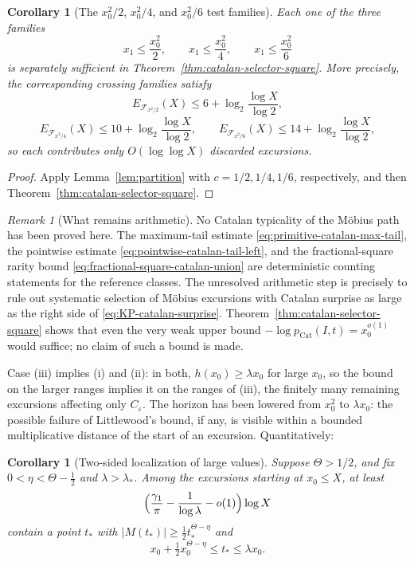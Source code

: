 \documentclass[11pt]{amsart}
\numberwithin{equation}{section}
\theoremstyle{plain}
\newtheorem{corollary}[theorem]{Corollary}
\theoremstyle{definition}
\theoremstyle{remark}
\newtheorem{remark}[theorem]{Remark}
\newcommand{\eps}{\varepsilon}
\newcommand{\F}{\mathcal{F}}
\begin{document}
\begin{corollary}[The $x_0^2/2$, $x_0^2/4$, and $x_0^2/6$ test families]
\label{cor:three-square-catalan-families}
Each one of the three families
\[
 x_1\le\frac{x_0^2}{2},\qquad
 x_1\le\frac{x_0^2}{4},\qquad
 x_1\le\frac{x_0^2}{6}
\]
is separately sufficient in Theorem~\ref{thm:catalan-selector-square}.
More precisely, the corresponding crossing families satisfy
\[
 E_{\F_{x^2/2}}(X)\le6+\log_2\frac{\log X}{\log2},
\]
\[
 E_{\F_{x^2/4}}(X)\le10+\log_2\frac{\log X}{\log2},
\qquad
 E_{\F_{x^2/6}}(X)\le14+\log_2\frac{\log X}{\log2},
\]
so each contributes only $O(\log\log X)$ discarded excursions.
\end{corollary}

\begin{proof}
Apply Lemma~\ref{lem:partition} with $c=1/2,1/4,1/6$, respectively, and
then Theorem~\ref{thm:catalan-selector-square}.
\end{proof}

\begin{remark}[What remains arithmetic]
\label{rem:catalan-selector-gap}
No Catalan typicality of the M\"obius path has been proved here.  The
maximum-tail estimate \eqref{eq:primitive-catalan-max-tail}, the pointwise
estimate \eqref{eq:pointwise-catalan-tail-left}, and the fractional-square
rarity bound \eqref{eq:fractional-square-catalan-union} are deterministic
counting statements for the reference classes.  The unresolved arithmetic
step is precisely to rule out systematic selection of M\"obius excursions
with Catalan surprise as large as the right side of
\eqref{eq:KP-catalan-surprise}.  Theorem~\ref{thm:catalan-selector-square}
shows that even the very weak upper bound
$-\log p_{\mathrm{Cat}}(I,t)=x_0^{o(1)}$ would suffice; no claim of such a
bound is made.
\end{remark}


Case (iii) implies (i) and (ii): in both, $h(x_0)\ge\lambda x_0$ for large
$x_0$, so the bound on the larger ranges implies it on the ranges of (iii),
the finitely many remaining excursions affecting only $C_\eps$. The horizon has
been lowered from $x_0^2$ to $\lambda x_0$: the possible failure of
Littlewood's bound, if any, is visible within a bounded multiplicative
distance of the start of an excursion. Quantitatively:

\begin{corollary}[Two-sided localization of large values]
\label{cor:two-sided}
Suppose $\Theta>1/2$, and fix $0<\eta<\Theta-\frac12$ and $\lambda>\lambda_*$.
Among the excursions starting at $x_0\le X$, at least
\[
\Bigl(\frac{\gamma_1}{\pi}-\frac1{\log\lambda}-o(1)\Bigr)\log X
\]
contain a point $t_*$ with $|M(t_*)|\ge\frac12t_*^{\Theta-\eta}$ and
\[
x_0+\tfrac12x_0^{\Theta-\eta}\le t_*\le\lambda x_0 .
\]
\end{corollary}
\end{document}
